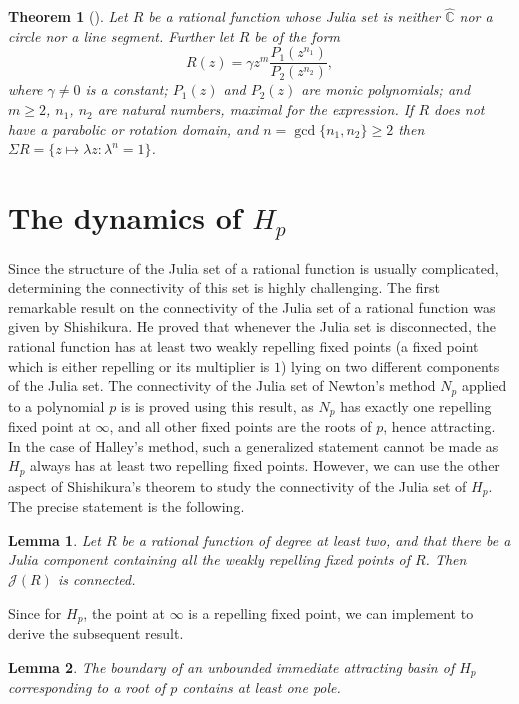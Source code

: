 \documentclass[12pt]{article}
\newtheorem{thm}{Theorem}[section]
\newtheorem{lem}{Lemma}[section]
\begin{document}
\begin{thm}[\cite{NP2025}] \label{CAOT}
Let $R$ be a rational function whose Julia set is neither $\widehat{\mathbb{C}}$ nor a circle nor a line segment. Further let $R$ be of the form
\begin{equation}
	R(z)=\gamma z^m\frac{P_1(z^{n_1})}{P_2(z^{n_2})},
	\label{form_coat}
\end{equation}
where $\gamma\neq 0$ is a constant; $P_1(z)$ and $P_2(z)$ are monic polynomials; and $m\geq 2$, $n_1$, $n_2$ are natural numbers, maximal for the expression. If $R$ does not have a parabolic or rotation domain, and $n=\gcd \{n_1,n_2\}\geq 2$ then $\Sigma R=\{z\mapsto \lambda z:\lambda^n=1\}$.
\end{thm}
\section{The dynamics of $H_p$}\label{Sect-3}
Since the structure of the Julia set of a rational function is usually complicated, determining the connectivity of this set is highly challenging. The first remarkable result on the connectivity of the Julia set of a rational function was given by Shishikura. He proved that whenever the Julia set is disconnected, the rational function has at least two weakly repelling fixed points (a fixed point which is either repelling or its multiplier is $1$) lying on two different components of the Julia set. The connectivity of the Julia set of Newton's method $N_p$ applied to a polynomial $p$ is is proved using this result, as $N_p$ has exactly one repelling fixed point at $\infty$, and all other fixed points are the roots of $p$, hence attracting. In the case of Halley's method, such a generalized statement cannot be made as $H_p$ always has at least two repelling fixed points. However, we can use the other aspect of Shishikura's theorem to study the connectivity of the Julia set of $H_p$. The precise statement is the following.
\begin{lem}\label{connected_J1}
Let $R$ be a rational function of degree at least two, and that there be a Julia component containing all the weakly repelling fixed points of $R$. Then $\mathcal{J}(R)$ is connected.
\end{lem}
Since for $H_p$, the point at $\infty$ is a repelling fixed point, we can implement \cite[Lemma 4.3]{Nayak-Pal2022} to derive the subsequent result.
\begin{lem}\label{bdry_pole}
The boundary of an unbounded immediate attracting basin of $H_p$ corresponding to a root of $p$ contains at least one pole.
\end{lem}
\end{document}
